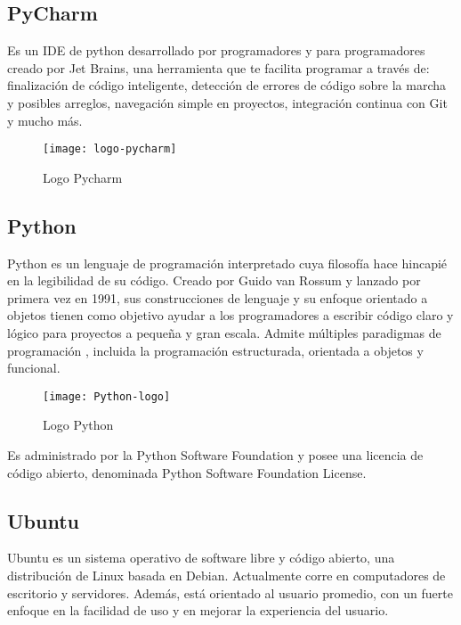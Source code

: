 \documentclass[ spanish, a4paper, 12pt, oneside]{report}
\begin{document}
\subsection{PyCharm}
Es un IDE de python desarrollado por programadores y para programadores creado por Jet Brains, una herramienta que te facilita programar a través de: finalización de código inteligente, detección de errores de código sobre la marcha y posibles arreglos, navegación simple en proyectos, 
integración continua con Git y mucho más. \\

\begin{figure}[!h]
   \centering
   \texttt{[image: logo-pycharm]}\\
      \caption{\label{fig: Logo Pycharm} Logo Pycharm}
\end{figure}

\subsection{Python}
Python es un lenguaje de programación interpretado cuya filosofía hace hincapié en la legibilidad de su código. Creado por Guido van Rossum y lanzado por primera vez en 1991, sus construcciones de lenguaje y su enfoque orientado a objetos tienen como objetivo ayudar a los 
programadores a escribir código claro y lógico para proyectos a pequeña y gran escala. Admite múltiples paradigmas de programación , incluida la programación estructurada, orientada a objetos y funcional. \\

\begin{figure}[!h]
   \centering
   \texttt{[image: Python-logo]}\\
      \caption{\label{fig: Logo Python} Logo Python}
\end{figure}

Es administrado por la Python Software Foundation y posee una licencia de código abierto, denominada Python Software Foundation License.\\
\subsection{Ubuntu}

Ubuntu es un sistema operativo de software libre y código abierto, una distribución de Linux basada en Debian. Actualmente corre en computadores de escritorio y servidores. Además, está orientado al usuario promedio, con un fuerte enfoque en la facilidad de uso y 
en mejorar la experiencia del usuario.\\
\end{document}
